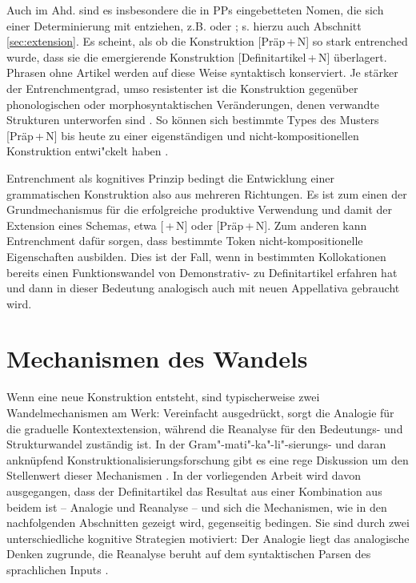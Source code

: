 Auch im Ahd. sind es insbesondere die in PPs eingebetteten Nomen, die sich einer Determinierung mit  entziehen, z.B.   oder   \parencite[84]{Oubouzar1992}; s. hierzu auch Abschnitt \ref{sec:extension}. Es scheint, als ob die Konstruktion [Präp\,+\,N] so stark entrenched wurde, dass sie die emergierende Konstruktion [Definitartikel\,+\,N] überlagert. Phrasen ohne Artikel werden auf diese Weise syntaktisch konserviert. Je stärker der Entrenchmentgrad, umso resistenter ist die Konstruktion gegenüber phonologischen oder morphosyntaktischen Veränderungen, denen verwandte Strukturen unterworfen sind \parencite[715]{Bybee2006}. So können sich bestimmte Types des Musters [Präp\,+\,N] bis heute zu einer eigenständigen und nicht-kompositionellen Konstruktion entwi"ckelt haben \parencite[343-344]{Himmelmann1998}. 

Entrenchment als kognitives Prinzip bedingt die Entwicklung einer grammatischen Konstruktion also aus mehreren Richtungen. Es ist zum einen der Grundmechanismus für die erfolgreiche produktive Verwendung und damit der Extension eines Schemas, etwa [\,+\,N] oder [Präp\,+\,N]. Zum anderen kann Entrenchment dafür sorgen, dass bestimmte Token nicht-kompositionelle Eigenschaften ausbilden. Dies ist der Fall, wenn  in bestimmten Kollokationen bereits einen Funktionswandel von Demonstrativ- zu Definitartikel erfahren hat und dann in dieser Bedeutung analogisch auch mit neuen Appellativa gebraucht wird. 


\section{Mechanismen des Wandels}\label{sec:mechanismen}

Wenn eine neue Konstruktion entsteht, sind typischerweise zwei Wandelmechanismen am Werk: Vereinfacht ausgedrückt, sorgt die Analogie für die graduelle Kontextextension, während die Reanalyse für den Bedeutungs- und Strukturwandel zuständig ist. In der Gram"-mati"-ka"-li"-sierungs- und daran anknüpfend  Konstruktionalisierungsforschung gibt es eine rege Diskussion um den Stellenwert dieser Mechanismen \parencite[vgl. u.a.][]{Haspelmath1998,Lehmann2004,Fischer2007}. In der vorliegenden Arbeit wird davon ausgegangen, dass der Definitartikel das Resultat aus einer Kombination aus beidem ist --  Analogie und Reanalyse -- und sich die Mechanismen, wie in den nachfolgenden Abschnitten gezeigt wird, gegenseitig bedingen. Sie sind durch zwei unterschiedliche kognitive Strategien motiviert: Der Analogie liegt das analogische Denken zugrunde, die Reanalyse beruht auf dem syntaktischen Parsen des sprachlichen Inputs \parencite[38]{Traugott2013}.  



